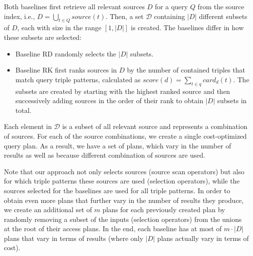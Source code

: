 Both baselines first retrieve all relevant sources $D$ for a query $Q$
from the source index, i.e., $D = \bigcup_{t \in Q} source(t)$. Then, a set $\mathcal{D}$ containing $|D|$ different subsets of $D$, each with size in the range $[1,|D|]$ is created. 
The baselines differ in how these
subsets are selected:
\begin{itemize}
\item Baseline RD randomly selects the $|D|$ subsets.
\item Baseline RK first ranks sources in $D$ by the number of
  contained triples that match query triple patterns, calculated as
  $score(d) = \sum_{t \in q} card_d(t)$. The subsets are created
  by starting with the highest ranked source and then successively
  adding sources in the order of their rank to obtain $|D|$ subsets in
  total.
\end{itemize}
Each element in $\mathcal{D}$ is a subset of all relevant source and
represents a combination of sources. For each of the source
combinations, we create a single cost-optimized query plan. As a result, we have a set of plans, which vary in the number of results as well as because different combination of sources are used. 

Note that our approach not only selects sources (source scan operators) but also for which triple patterns these sources are used (selection operators), while the sources selected for the baselines are used for all triple patterns. In order to obtain even more plans that further vary in the number of results they produce, we create an additional set of $m$ plans for each
previously created plan by randomly removing a subset of the inputs (selection operators) from the unions at the root of their access plans. 
In the end, each baseline
has at most of $m \cdot |D|$ plans that vary in terms of results (where only $|D|$ plans actually vary in terms of cost). 

